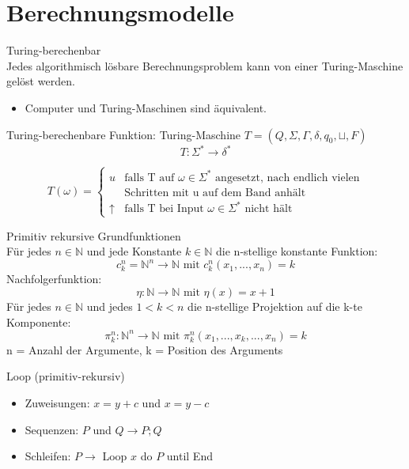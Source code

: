 \graphicspath{{images/}}

\section*{Berechnungsmodelle}

\begin{definition}{Turing-berechenbar}\\
    Jedes algorithmisch lösbare Berechnungsproblem kann von einer Turing-Maschine gelöst werden.
    \begin{itemize}
        \item Computer und Turing-Maschinen sind äquivalent.
    \end{itemize}
    Turing-berechenbare Funktion: Turing-Maschine $T = (Q, \Sigma, \Gamma, \delta, q_0, \sqcup, F)$
    $$T: \Sigma^* \rightarrow \delta^*$$

    $$T(\omega) = \begin{cases}
        u & \text{falls T auf } \omega \in \Sigma^* \text{ angesetzt, nach endlich vielen}\\ 
        &\text{Schritten mit u auf dem Band anhält}\\
        \uparrow & \text{falls T bei Input } \omega \in \Sigma^* \text{ nicht hält}
    \end{cases}$$
\end{definition}

\begin{theorem}{Primitiv rekursive Grundfunktionen}\\
    Für jedes $n \in \mathbb{N}$ und jede Konstante $k \in \mathbb{N}$ die n-stellige konstante Funktion:
    $$c_k^n = \mathbb{N}^n \rightarrow \mathbb{N} \text{ mit } c_k^n (x_1, ... , x_n) = k$$
    Nachfolgerfunktion:
    $$\eta : \mathbb{N} \rightarrow \mathbb{N} \text{ mit } \eta (x) = x + 1$$
    Für jedes $n \in \mathbb{N}$ und jedes $1 < k < n$ die n-stellige Projektion auf die k-te Komponente:
    $$\pi_k^n : \mathbb{N}^n \rightarrow \mathbb{N} \text{ mit } \pi_k^n (x_1, ... ,x_k,..., x_n) = k$$
    n = Anzahl der Argumente, k = Position des Arguments
\end{theorem}

\begin{KR}{Loop (primitiv-rekursiv)}
    \begin{itemize}
        \item Zuweisungen: $x = y + c$ und $x = y - c$
        \item Sequenzen: $P$ und $Q \rightarrow P; Q$
        \item Schleifen: $P \rightarrow$ Loop $x$ do $P$ until End
    \end{itemize}
\end{KR}

